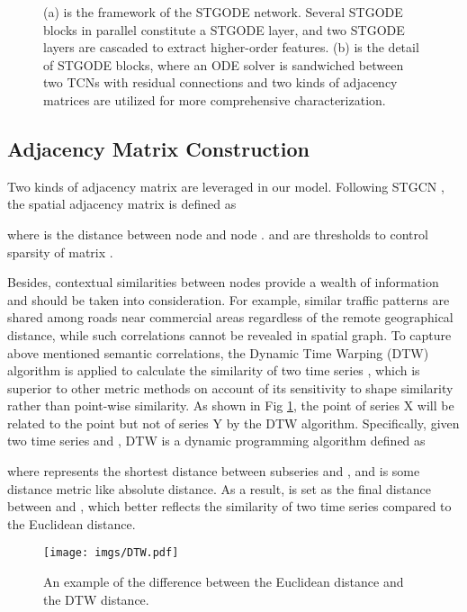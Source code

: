 \documentclass[sigconf]{acmart}
\theoremstyle{definition}
\begin{document}
\begin{figure*}[htbp]
  \centering
  \caption{(a) is the framework of the STGODE network. Several STGODE blocks in parallel constitute a STGODE layer, and two STGODE layers are cascaded to extract higher-order features. (b) is the detail of STGODE blocks, where an ODE solver is sandwiched between two TCNs with residual connections and two kinds of adjacency matrices are utilized for more comprehensive characterization.}
\end{figure*}

\subsection{Adjacency Matrix Construction}
Two kinds of adjacency matrix are leveraged in our model. Following STGCN \cite{yu2018spatio}, the spatial adjacency matrix is defined as 

where  is the distance between node  and node .  and  are thresholds to control sparsity of matrix .

Besides, contextual similarities between nodes provide a wealth of information and should be taken into consideration. For example, similar traffic patterns are shared among roads near commercial areas regardless of the remote geographical distance, while such correlations cannot be revealed in spatial graph. To capture above mentioned semantic correlations, the Dynamic Time Warping (DTW) algorithm is applied to calculate the similarity of two time series \cite{berndt1994using}, which is superior to other metric methods on account of its sensitivity to shape similarity rather than point-wise similarity. As shown in Fig \ref{fig:dtw}, the point  of series X will be related to the point  but not  of series Y by the DTW algorithm. Specifically, given two time series  and , DTW is a dynamic programming algorithm defined as

where  represents the shortest distance between subseries  and , and  is some distance metric like absolute distance. As a result,  is set as the final distance between  and , which better reflects the similarity of two time series compared to the Euclidean distance.
\begin{figure}[hbtp]
  \centering
  \texttt{[image: imgs/DTW.pdf]}
  \caption{An example of the difference between the Euclidean distance and the DTW distance.}\label{fig:dtw}
\end{figure}
\end{document}
